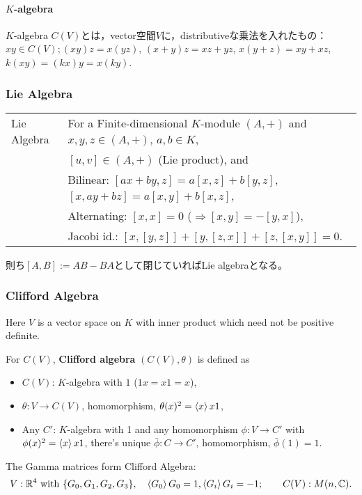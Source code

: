 \vspace{.5zw}

\paragraph{$K$-algebra}
$K$-algebra $C(V)$とは，vector空間$V$に，distributiveな乗法を入れたもの：\\
\qquad$xy\in C(V);$\quad $(xy)z=x(yz)$, $(x+y)z=xz+yz$, $x(y+z)=xy+xz$, $k(xy)=(kx)y=x(ky)$.

\subsubsection{Lie Algebra}
\begin{tabular}{l@{ :\ \ \ }l}
Lie Algebra & For a Finite-dimensional $K$-module $(A,+)$ and $x,y,z\in(A,+)$, $a,b\in K$,\\
            & \quad $[u,v]\in (A,+)$ (Lie product), and\\
            & \quad Bilinear: $[ax+by, z] = a[x,z]+b[y,z]$, $[x, ay+bz] = a[x,y]+b[x,z]$,\\
            & \quad Alternating: $[x,x]=0$ \quad ($\Longrightarrow [x,y]=-[y,x]$),\\
            & \quad Jacobi id.: $[x,[y,z]]+[y,[z,x]]+[z,[x,y]]=0$.\\
\end{tabular}\par
則ち$[A,B]:=AB-BA$として閉じていればLie algebraとなる。
\subsubsection{Clifford Algebra}
Here $V$ is a vector space on $K$ with inner product which need not be positive definite.

For $C(V)$, {\bf Clifford algebra} $(C(V),\theta)$ is defined as
\begin{itemize}
 \item $C(V)$: $K$-algebra with $1$ \quad ($1x=x1=x$),
 \item $\theta: V\to C(V)$, homomorphism, $\theta(x)^2 = \braket xx1$,
 \item Any $C'$: $K$-algebra with 1 and any homomorphism $\phi: V\to C'$ with $\phi(x)^2=\braket xx1$, there's unique $\bar\phi: C\to C'$, homomorphism, $\bar\phi(1)=1$.
\end{itemize}
\begin{rightnote}
The Gamma matrices form Clifford Algebra:
\[
  V: \mathbb R^4 \text{ with } \{G_0, G_1, G_2, G_3\},\quad
  \braket{G_0}{G_0}=1, \braket{G_i}{G_i}=-1; \qquad
  C(V): M(n,\mathbb C).
\]\vspace{-2zw}
\end{rightnote}

